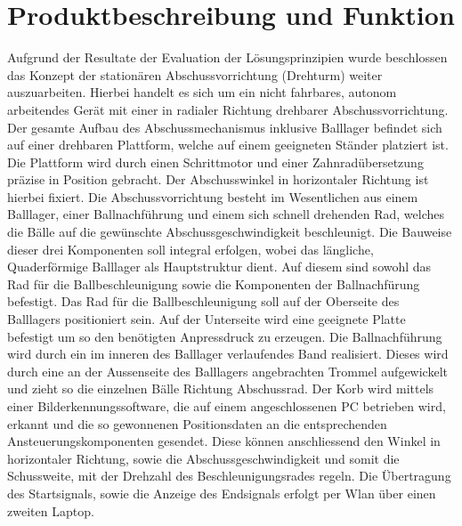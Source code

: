 \section{Produktbeschreibung und Funktion}

Aufgrund der Resultate der Evaluation der Lösungsprinzipien wurde beschlossen 
das Konzept der stationären Abschussvorrichtung (Drehturm) weiter 
auszuarbeiten. 
%
Hierbei handelt es sich um ein nicht fahrbares, autonom arbeitendes Gerät mit 
einer in radialer Richtung drehbarer Abschussvorrichtung. Der gesamte Aufbau 
des Abschussmechanismus inklusive Balllager befindet sich auf einer drehbaren 
Plattform, welche auf einem geeigneten Ständer platziert ist. Die Plattform 
wird durch einen Schrittmotor und einer Zahnradübersetzung präzise in Position 
gebracht. Der Abschusswinkel in horizontaler Richtung ist hierbei fixiert. 
%
Die Abschussvorrichtung besteht im Wesentlichen aus einem Balllager, einer 
Ballnachführung und einem sich schnell drehenden Rad, welches die Bälle auf 
die gewünschte Abschussgeschwindigkeit beschleunigt. Die Bauweise dieser drei 
Komponenten soll integral erfolgen, wobei das längliche, Quaderförmige 
Balllager als Hauptstruktur dient. Auf diesem sind sowohl das Rad für die 
Ballbeschleunigung sowie die Komponenten der Ballnachfürung befestigt.
%
Das Rad für die Ballbeschleunigung soll auf der Oberseite des Balllagers 
positioniert sein. Auf der Unterseite wird eine geeignete Platte befestigt um 
so den benötigten Anpressdruck zu erzeugen. 
%
Die Ballnachführung wird durch ein im inneren des Balllager verlaufendes Band 
realisiert. Dieses wird durch eine an der Aussenseite des Balllagers 
angebrachten Trommel aufgewickelt und zieht so die einzelnen Bälle Richtung 
Abschussrad.
%
Der Korb wird mittels einer Bilderkennungssoftware, die auf einem 
angeschlossenen PC betrieben wird, erkannt und die so gewonnenen 
Positionsdaten an die entsprechenden Ansteuerungskomponenten gesendet. Diese 
können anschliessend den Winkel in horizontaler Richtung, sowie die 
Abschussgeschwindigkeit und somit die Schussweite, mit der Drehzahl des 
Beschleunigungsrades regeln.
%
Die Übertragung des Startsignals, sowie die Anzeige des Endsignals erfolgt per 
Wlan über einen zweiten Laptop.